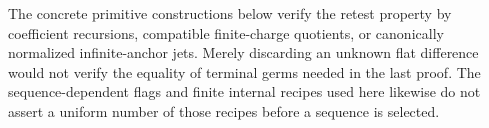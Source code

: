 \begin{remark}
The concrete primitive constructions below verify the retest property
by coefficient recursions, compatible finite-charge quotients, or
canonically normalized infinite-anchor jets.  Merely discarding an
unknown flat difference would not verify the equality of terminal
germs needed in the last proof.  The sequence-dependent flags and
finite internal recipes used here likewise do not assert a uniform
number of those recipes before a sequence is selected.
\end{remark}
